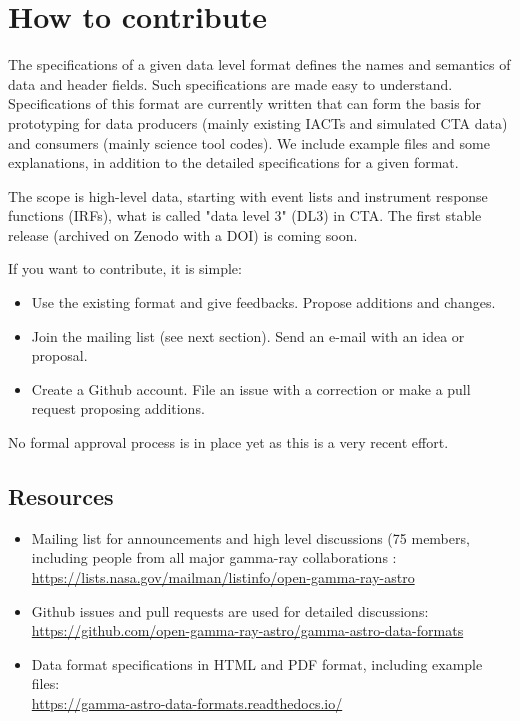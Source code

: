 \section{How to contribute}

The specifications of a given data level format defines the names and semantics of data and header fields. Such specifications are made easy to understand. Specifications of this format are currently written that can form the basis for prototyping for data producers (mainly existing IACTs and simulated CTA data) and consumers (mainly science tool codes). We include example files and some explanations, in addition to the detailed specifications for a given format. 

The scope is high-level data, starting with event lists and instrument response functions (IRFs), what is called "data level 3" (DL3) in CTA. The first stable release (archived on Zenodo with a DOI) is coming soon.

If you want to contribute, it is simple:

\begin{itemize}
\item{}Use the existing format and give feedbacks. Propose additions and changes.
\item{}Join the mailing list (see next section). Send an e-mail with an idea or proposal.
\item{}Create a Github account. File an issue with a correction or make a pull request proposing additions.
\end{itemize}

No formal approval process is in place yet as this is a very recent effort.

\subsection{Resources}

\begin{itemize}
\item{} Mailing list for announcements and high level discussions (75 members, including people from all major gamma-ray collaborations :\\     \url{https://lists.nasa.gov/mailman/listinfo/open-gamma-ray-astro}
\item{}Github issues and pull requests are used for detailed discussions:\\ \url{https://github.com/open-gamma-ray-astro/gamma-astro-data-formats}
\item{}Data format specifications in HTML and PDF format, including example files:\\ \url{https://gamma-astro-data-formats.readthedocs.io/}
\end{itemize}

